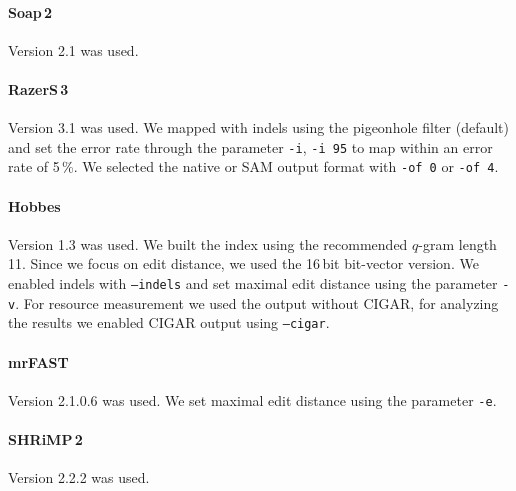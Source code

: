\paragraph{Soap\,2}
Version 2.1 was used.

\paragraph{RazerS\,3}
Version 3.1 was used.
We mapped with indels using the pigeonhole filter (default) and set the error rate through the parameter \texttt{-i}, \eg \texttt{-i 95} to map within an error rate of 5\,\%.
We selected the native or SAM output format with \texttt{-of 0} or \texttt{-of 4}.

\paragraph{Hobbes}
Version 1.3 was used.
We built the index using the recommended
$q$-gram length 11.
Since we focus on edit distance, we used the 16\,bit bit-vector version.%
We enabled indels with \texttt{--indels} and set maximal edit distance using the parameter \texttt{-v}.
For resource measurement we used the output without CIGAR, for analyzing the results we enabled CIGAR output using \texttt{--cigar}.

\paragraph{mrFAST}
Version 2.1.0.6 was used.
We set maximal edit distance using the parameter \texttt{-e}.

\paragraph{SHRiMP\,2}
Version 2.2.2 was used.

